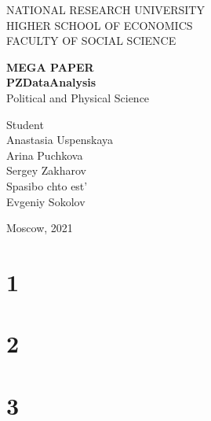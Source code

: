 \documentclass[14pt]{extarticle}
\begin{document}
	
	
	\thispagestyle{empty} 
	
	\begin{center}
		NATIONAL RESEARCH UNIVERSITY
		\\
		HIGHER SCHOOL OF ECONOMICS
		\\
		FACULTY OF SOCIAL SCIENCE
		
	\end{center}
	\vspace{12ex}
	
	\begin{center}
		\textbf{MEGA PAPER}\\
		\vspace{2ex}
		\textbf{PZDataAnalysis}\\
		\vspace{2ex}
		Political and Physical Science
	\end{center}
	
	\vspace{5ex}
	\begin{flushright}
		\hspace{40ex}
		Student\\
		Anastasia Uspenskaya \\
		Arina Puchkova \\
		Sergey Zakharov\\
		
		\vspace{5ex}
		Spasibo chto est'\\
		Evgeniy Sokolov \\
		
		
		
	\end{flushright}
	
	\begin{center}
		\vfill
		Moscow, 2021
	\end{center}
	
	\newpage
	
	
	\tableofcontents
	
	
	\section{1} %
	
	
	\section{2} %
	
	
	
	\section{3} %
	
	
\end{document}
